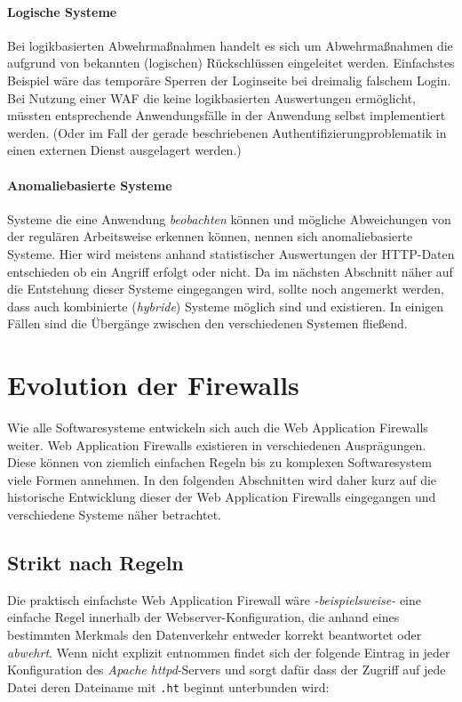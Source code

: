 \paragraph{Logische Systeme}
Bei logikbasierten Abwehrmaßnahmen handelt es sich um Abwehrmaßnahmen die aufgrund von bekannten (logischen) Rückschlüssen eingeleitet werden. Einfachstes Beispiel wäre das temporäre Sperren der Loginseite bei dreimalig falschem Login. Bei Nutzung einer WAF die keine logikbasierten Auswertungen ermöglicht, müssten entsprechende Anwendungsfälle in der Anwendung selbst implementiert werden. (Oder im Fall der gerade beschriebenen Authentifizierungproblematik in einen externen Dienst ausgelagert werden.)

\paragraph{Anomaliebasierte Systeme}
Systeme die eine Anwendung \emph{beobachten} können und mögliche Abweichungen von der regulären Arbeitsweise erkennen können, nennen sich anomaliebasierte Systeme. Hier wird meistens anhand statistischer Auswertungen der HTTP-Daten entschieden ob ein Angriff erfolgt oder nicht. Da im nächsten Abschnitt näher auf die Entstehung dieser Systeme eingegangen wird, sollte noch angemerkt werden, dass auch kombinierte (\emph{hybride}) Systeme möglich sind und existieren. In einigen Fällen sind die Übergänge zwischen den verschiedenen Systemen fließend.

\section{Evolution der Firewalls}
\label{sec:relatedwork}

Wie alle Softwaresysteme entwickeln sich auch die Web Application Firewalls weiter. Web Application Firewalls existieren in verschiedenen Ausprägungen. Diese können von ziemlich einfachen Regeln bis zu komplexen Softwaresystem viele Formen annehmen. In den folgenden Abschnitten wird daher kurz auf die historische Entwicklung dieser der Web Application Firewalls eingegangen und verschiedene Systeme näher betrachtet.

\subsection{Strikt nach Regeln}

Die praktisch einfachste Web Application Firewall wäre \emph{-beispielsweise-} eine einfache Regel innerhalb der Webserver-Konfiguration, die anhand eines bestimmten Merkmals den Datenverkehr entweder korrekt beantwortet oder \glqq\emph{abwehrt}\grqq. Wenn nicht explizit entnommen findet sich der folgende Eintrag in jeder Konfiguration des \emph{Apache httpd}-Servers und sorgt dafür dass der Zugriff auf jede Datei deren Dateiname mit \texttt{.ht} beginnt unterbunden wird:

